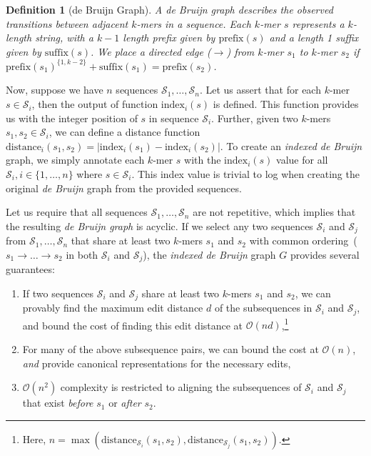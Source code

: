 \documentclass[masters]{ucbthesis}
\newtheorem{defn}{Definition}
\begin{document}
\begin{defn}[de Bruijn Graph]
\label{defn:dbg}
A de Bruijn graph describes the observed transitions between adjacent $k$-mers in a sequence. Each
$k$-mer $s$ represents a $k$-length string, with a $k - 1$ length prefix given by $\text{prefix}(s)$ and a
length 1 suffix given by $\text{suffix}(s)$. We place a directed edge ($\rightarrow$) from $k$-mer $s_1$ to
$k$-mer $s_2$ if $\text{prefix}(s_1)^{\{1, k - 2\}} + \text{suffix}(s_1) = \text{prefix}(s_2)$.
\end{defn}

Now, suppose we have $n$ sequences $\mathcal{S}_1, \dots, \mathcal{S}_n$. Let us assert that for each
$k$-mer $s \in \mathcal{S}_i$, then the output of function $\text{index}_i(s)$ is defined. This function
provides us with the integer position of $s$ in sequence $\mathcal{S}_i$. Further, given two $k$-mers
$s_1, s_2 \in \mathcal{S}_i$, we can define a distance function
$\text{distance}_i(s_1, s_2) = | \text{index}_i(s_1) - \text{index}_i(s_2) |$. To create an \emph{indexed
de Bruijn} graph, we simply annotate each $k$-mer $s$ with the $\text{index}_i(s)$ value for all
$\mathcal{S}_i, i \in \{1, \dots, n\}$ where $s \in \mathcal{S}_i$. This index value is trivial to log when
creating the original \emph{de Bruijn} graph from the provided sequences.

Let us require that all sequences $\mathcal{S}_1, \dots, \mathcal{S}_n$ are not repetitive, which implies
that the resulting \emph{de Bruijn graph} is acyclic. If we select any two sequences $\mathcal{S}_i$ and
$\mathcal{S}_j$ from $\mathcal{S}_1, \dots, \mathcal{S}_n$ that share at least two $k$-mers $s_1$ and
$s_2$ with common ordering~($s_1 \rightarrow \dots \rightarrow s_2$ in both $\mathcal{S}_i$ and
$\mathcal{S}_j$), the \emph{indexed de Bruijn} graph $G$ provides several guarantees:

\begin{enumerate}
\item If two sequences $\mathcal{S}_i$ and $\mathcal{S}_j$ share at least two $k$-mers $s_1$ and
$s_2$, we can provably find the maximum edit distance $d$ of the subsequences in $\mathcal{S}_i$ and
$\mathcal{S}_j$, and bound the cost of finding this edit distance at $\mathcal{O}(nd)$,\footnote{Here,
$n = \max(\text{distance}_{\mathcal{S}_i}(s_1, s_2), \text{distance}_{\mathcal{S}_j}(s_1, s_2))$.}
\item For many of the above subsequence pairs, we can bound the cost at $\mathcal{O}(n)$, \emph{and}
provide canonical representations for the necessary edits,
\item $\mathcal{O}(n^2)$ complexity is restricted to aligning the subsequences of $\mathcal{S}_i$ and
$\mathcal{S}_j$ that exist \emph{before} $s_1$ or \emph{after} $s_2$.
\end{enumerate}
\end{document}
